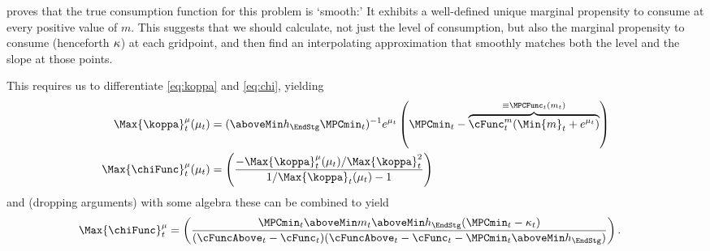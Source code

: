 \documentclass[SolvingMicroDSOPs]{subfiles}
\begin{document}
\cite{BufferStockTheory} proves that the true consumption function for
this problem
is `smooth:' It
exhibits a well-defined unique marginal propensity to consume at every
positive value of $m$.  This suggests that we should calculate, not
just the level of consumption, but also the marginal propensity to
consume (henceforth $\kappa$) at each gridpoint, and then find an
interpolating approximation that smoothly matches both the level and the slope
at those points.

This requires us to differentiate \eqref{eq:koppa} and \eqref{eq:chi}, yielding
\begin{equation}\begin{gathered}\begin{aligned}
      \Max{\koppa}_{\prd}^{\mu}(\mu_{\prd})   & = (\aboveMin \hNrm_{\EndStg} \MPCmin_{\prd})^{-1}e^{\mu_{\prd}}\left(\MPCmin_{\prd}-\overbrace{\cFunc^{\mNrm}_{\prd}(\Min{m}_{\prd}+e^{\mu_{\prd}})}^{\equiv \MPCFunc_{\prd}(\mNrm_{\prd})}\right)  \label{eq:koppaPrime}
      \\ \Max{\chiFunc}_{\prd}^{\mu}(\mu_{\prd})  & = \left(\frac{-\Max{\koppa}_{\prd}^{\mu}(\mu_{\prd})/\Max{\koppa}_{\prd}^{2}}{1/\Max{\koppa}_{\prd}(\mu_{\prd})-1}\right)
    \end{aligned}\end{gathered}\end{equation}
and (dropping arguments) with some algebra these can be combined to yield
\begin{equation}\begin{gathered}\begin{aligned}
      \Max{\chiFunc}_{\prd}^{\mu}  & = \left(\frac{\MPCmin_{\prd} \aboveMin \mNrm_{\prd} \aboveMin \hNrm_{\EndStg} (\MPCmin_{\prd}-\MPC_{\prd})}
        {(\cFuncAbove_{\prd}-\cFunc_{\prd})(\cFuncAbove_{\prd}-\cFunc_{\prd} - \MPCmin_{\prd} \aboveMin \hNrm_{\EndStg})}\right).
    \end{aligned}\end{gathered}\end{equation}
\end{document}
